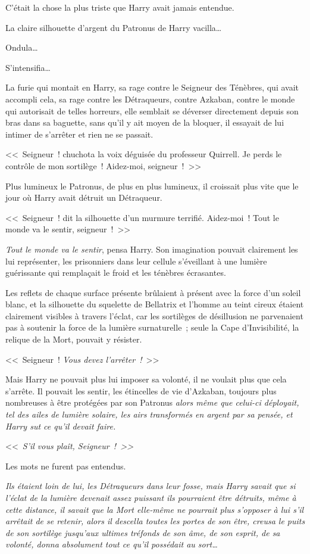 C'était la chose la plus triste que Harry avait jamais entendue.

La claire silhouette d'argent du Patronus de Harry vacilla…

Ondula…

S'intensifia…

La furie qui montait en Harry, sa rage contre le Seigneur des Ténèbres, qui avait accompli cela, sa rage contre les Détraqueurs, contre Azkaban, contre le monde qui autorisait de telles horreurs, elle semblait se déverser directement depuis son bras dans sa baguette, sans qu'il y ait moyen de la bloquer, il essayait de lui intimer de s'arrêter et rien ne se passait.

<<~Seigneur~! chuchota la voix déguisée du professeur Quirrell. Je perds le contrôle de mon sortilège~! Aidez-moi, seigneur~!~>>

Plus lumineux le Patronus, de plus en plus lumineux, il croissait plus vite que le jour où Harry avait détruit un Détraqueur.

<<~Seigneur~! dit la silhouette d'un murmure terrifié. Aidez-moi~! Tout le monde va le sentir, seigneur~!~>>

\emph{Tout le monde va le sentir}, pensa Harry. Son imagination pouvait clairement les lui représenter, les prisonniers dans leur cellule s'éveillant à une lumière guérissante qui remplaçait le froid et les ténèbres écrasantes.

Les reflets de chaque surface présente brûlaient à présent avec la force d'un soleil blanc, et la silhouette du squelette de Bellatrix et l'homme au teint cireux étaient clairement visibles à travers l'éclat, car les sortilèges de désillusion ne parvenaient pas à soutenir la force de la lumière surnaturelle~; seule la Cape d'Invisibilité, la relique de la Mort, pouvait y résister.

<<~Seigneur~! \emph{Vous devez l'arrêter~!}~>>

Mais Harry ne pouvait plus lui imposer sa volonté, il ne voulait plus que cela s'arrête. Il pouvait les sentir, les étincelles de vie d'Azkaban, toujours plus nombreuses à être protégées par son Patronus \emph{alors même que celui-ci déployait, tel des ailes de lumière solaire, les airs transformés en argent par sa pensée, et Harry sut ce qu'il devait faire.}

<<~\emph{S'il vous plaît, Seigneur~!~>>}

Les mots ne furent pas entendus.

\emph{Ils étaient loin de lui, les Détraqueurs dans leur fosse, mais Harry savait que si l'éclat de la lumière devenait assez puissant ils pourraient être détruits, même à cette distance, il savait que la Mort elle-même ne pourrait plus s'opposer à lui s'il arrêtait de se retenir, alors il descella toutes les portes de son être, creusa le puits de son sortilège jusqu'aux ultimes tréfonds de son âme, de son esprit, de sa volonté, donna absolument tout ce qu'il possédait au sort…}

